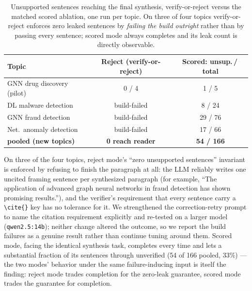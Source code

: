\documentclass[conference]{IEEEtran}
\begin{document}
\begin{table}[t]
\centering
\caption{Unsupported sentences reaching the final synthesis, verify-or-reject
versus the matched scored ablation, one run per topic. On three of four topics
verify-or-reject enforces zero leaked sentences by \emph{failing the build
outright} rather than by passing every sentence; scored mode always completes
and its leak count is directly observable.}
\label{tab:downstream}
\begin{tabular}{@{}lcc@{}}
\toprule
Topic & Reject (verify-or-reject) & Scored: unsup.\,/\,total \\
\midrule
GNN drug discovery (pilot) & 0 / 4 & 1 / 5 \\
DL malware detection       & build-failed & 8 / 24 \\
GNN fraud detection        & build-failed & 29 / 76 \\
Net.\ anomaly detection    & build-failed & 17 / 66 \\
\midrule
\textbf{pooled (new topics)} & \textbf{0 reach reader} & \textbf{54 / 166} \\
\bottomrule
\end{tabular}
\end{table}

On three of the four topics, reject mode's ``zero unsupported sentences''
invariant is enforced by refusing to finish the paragraph at all: the LLM
reliably writes one uncited framing sentence per synthesized paragraph (for
example, ``The application of advanced graph neural networks in fraud
detection has shown promising results.''), and the verifier's requirement that
every sentence carry a \texttt{\textbackslash cite\{\}} key has no tolerance
for it. We strengthened the correction-retry prompt to name the citation
requirement explicitly and re-tested on a larger model (\texttt{qwen2.5:14b});
neither change altered the outcome, so we report the build failures as a
genuine result rather than continue tuning around them. Scored mode, facing the
identical synthesis task, completes every time and lets a substantial fraction
of its sentences through unverified (54 of 166 pooled, 33\%) --- the two modes'
behavior under the same failure-inducing input is itself the finding: reject
mode trades completion for the zero-leak guarantee, scored mode trades the
guarantee for completion.
\end{document}
